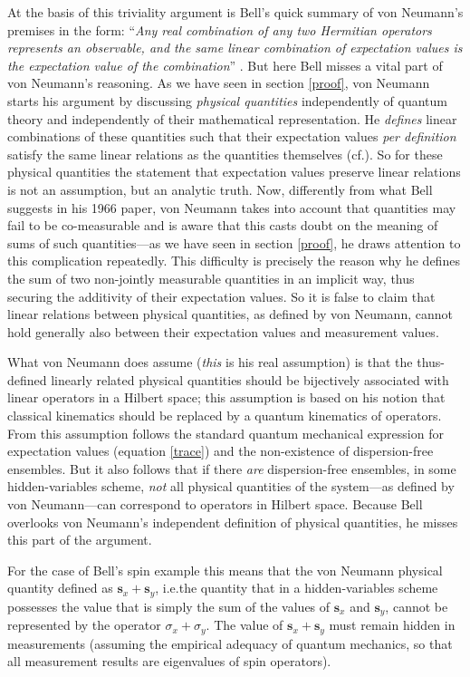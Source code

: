 \documentclass[12pt]{article}
\begin{document}
At the basis of this triviality argument is Bell's quick summary of von Neumann's premises in the form: ``\emph{Any real combination of any two Hermitian operators represents an observable, and the same linear combination of expectation values is the expectation value of the combination}'' \cite[pp.\@ 448--449]{bell66}. But here Bell misses a vital part of von Neumann's reasoning. As we have seen in section \ref{proof}, von Neumann starts his argument by discussing \emph{physical quantities} independently of quantum theory and independently of their mathematical representation. He \emph{defines} linear combinations of these quantities such that their expectation values \emph{per definition} satisfy the same linear relations as the quantities themselves (cf.\@ \cite{bub}). So for these physical quantities the statement that expectation values preserve linear relations is not an assumption, but an analytic truth. Now, differently from what Bell suggests in his 1966 paper, von Neumann takes into account that quantities may fail to be co-measurable and is aware that this casts doubt on the meaning of sums of such quantities---as we have seen in section \ref{proof}, he draws attention to this complication repeatedly. This difficulty is precisely the reason why he defines the sum of two non-jointly measurable quantities in an implicit way, thus securing the additivity of their expectation values. So it is false to claim that linear relations between physical quantities, as defined by von Neumann, cannot hold generally also between their expectation values and measurement values.

What von Neumann does assume (\emph{this} is his real assumption) is that the thus-defined linearly related physical quantities should be bijectively associated with linear operators in a Hilbert space; this assumption is based on his notion that classical kinematics should be replaced by a quantum kinematics of operators. From this assumption follows the standard quantum mechanical expression for expectation values (equation \ref{trace}) and the non-existence of dispersion-free ensembles. But it also follows that if there \emph{are} dispersion-free ensembles, in some hidden-variables scheme, \emph{not} all physical quantities of the system---as defined by von Neumann---can correspond to operators in Hilbert space. Because Bell overlooks von Neumann's independent definition of physical quantities, he misses this part of the argument.

For the case of Bell's spin example this means that the von Neumann physical quantity defined as $\textbf{s}_x + \textbf{s}_y$, i.e.\@ the quantity that in a hidden-variables scheme possesses the value that is simply the sum of the values of $\textbf{s}_x$ and $\textbf{s}_y$, cannot be represented by the operator $\sigma_x + \sigma_y$. The value of $\textbf{s}_x + \textbf{s}_y$ must remain hidden in measurements (assuming the empirical adequacy of quantum mechanics, so that all measurement results are eigenvalues of spin operators).
\end{document}

